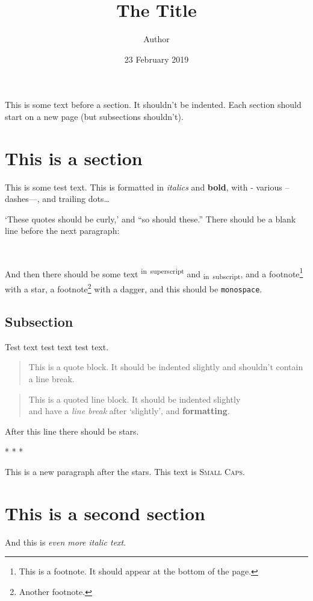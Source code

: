 \documentclass[12pt,a4paper,]{article}
\title{The Title}
\author{Author}
\date{23 February 2019}
\newif\iffootnote
\let\Footnote\footnote
\renewcommand\footnote[1]{\begingroup\footnotetrue\Footnote{#1}\endgroup}
\let\OldRule\rule
\renewcommand{\rule}[2]{\iffootnote\OldRule{#1}{#2}\else* * *\fi}
\begin{document}
\maketitle

\frenchspacing

\noindent
\newcommand{\sectionbreak}{\clearpage}
This is some text before a section. It shouldn't be indented. Each
section should start on a new page (but subsections shouldn't).

\section{This is a section}\label{this-is-a-section}

This is some test text. This is formatted in \emph{italics} and
\textbf{bold}, with - various -- dashes---, and trailing dots\ldots{}

`These quotes should be curly,' and ``so should these.'' There should be
a blank line before the next paragraph:

~

And then there should be some text \textsuperscript{in~superscript} and
\textsubscript{in~subscript}, and a footnote\footnote{This is a
  footnote. It should appear at the bottom of the page.} with a star, a
footnote\footnote{Another footnote.} with a dagger, and this should be
\texttt{monospace}.

\subsection{Subsection}\label{subsection}

Test text test text test text.

\begin{quote}
This is a quote block. It should be indented slightly and shouldn't
contain a line break.
\end{quote}

\begin{quote}
This is a quoted line block. It should be indented slightly\\
and have a \emph{line break} after `slightly', and \textbf{formatting}.
\end{quote}

After this line there should be stars.

\begin{center}\rule{0.5\linewidth}{\linethickness}\end{center}

This is a new paragraph after the stars. This text is \textsc{Small
Caps}.

\section{This is a second section}\label{this-is-a-second-section}

And this is \emph{even more italic text}.
\end{document}

